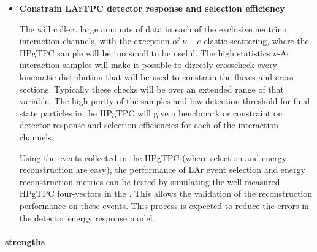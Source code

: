 \begin{itemize}
\item{{\bf Constrain LArTPC detector response and selection efficiency} 
    
The  will collect large amounts of data in each of the exclusive neutrino interaction channels, with the exception of $\nu-e$ elastic scattering, where the HPgTPC sample will be too small to be useful. The high statistics $\nu$-Ar interaction samples will make it possible to directly crosscheck every kinematic distribution that will be used to constrain the fluxes and cross sections.  Typically these checks will be over an extended range of that variable.  The high purity of the  samples and low detection threshold for final state particles in the HPgTPC will give a benchmark or constraint on  detector response and selection efficiencies for each of the interaction channels.

Using the events collected in the HPgTPC (where selection and energy reconstruction are easy), the performance of LAr event selection and energy reconstruction metrics can be tested by simulating the well-measured HPgTPC four-vectors in the .  This allows the validation of the  reconstruction performance on these events. This process is expected to reduce the  errors in the  detector energy response model.

    
}
    

\end{itemize}   
\paragraph{ strengths}

